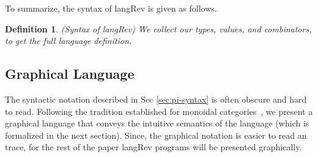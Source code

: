 \documentclass[preprint]{sigplanconf}
\newtheorem{definition}[theorem]{Definition}
\begin{document}
To summarize, the syntax of {{langRev}} is given as follows. 

\begin{definition}{(Syntax of {{langRev}})}
\label{def:langRev}
We collect our types, values, and combinators, to get the full language
definition.
%
\end{definition}

\subsection{Graphical Language}

The syntactic notation described in Sec \ref{sec:pi-syntax} is often
obscure and hard to read.  Following the tradition established for
monoidal categories~\cite{springerlink:10.1007/978-3-642-12821-94}, we
present a graphical language that conveys the intuitive semantics of
the language (which is formalized in the next section).  Since, the
graphical notation is easier to read an trace, for the rest of the
paper {{langRev}} programs will be presented graphically.
\end{document}
